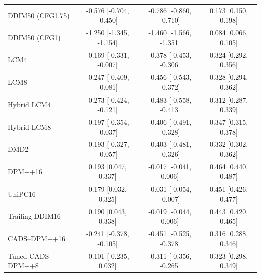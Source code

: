 \begin{table}[t]
\begin{tabular}{lccc}
DDIM50 (CFG1.75) & -0.576 [-0.704, -0.450] & -0.786 [-0.860, -0.710] & 0.173 [0.150, 0.198] \\
DDIM50 (CFG1) & -1.250 [-1.345, -1.154] & -1.460 [-1.566, -1.351] & 0.084 [0.066, 0.105] \\
LCM4 & -0.169 [-0.331, -0.007] & -0.378 [-0.453, -0.306] & 0.324 [0.292, 0.356] \\
LCM8 & -0.247 [-0.409, -0.081] & -0.456 [-0.543, -0.372] & 0.328 [0.294, 0.362] \\
Hybrid LCM4 & -0.273 [-0.424, -0.121] & -0.483 [-0.558, -0.413] & 0.312 [0.287, 0.339] \\
Hybrid LCM8 & -0.197 [-0.354, -0.037] & -0.406 [-0.491, -0.328] & 0.347 [0.315, 0.378] \\
DMD2 & -0.193 [-0.327, -0.057] & -0.403 [-0.481, -0.326] & 0.332 [0.302, 0.362] \\
DPM++16 & 0.193 [0.047, 0.337] & -0.017 [-0.041, 0.006] & 0.464 [0.440, 0.487] \\
UniPC16 & 0.179 [0.032, 0.325] & -0.031 [-0.054, -0.007] & 0.451 [0.426, 0.477] \\
Trailing DDIM16 & 0.190 [0.043, 0.338] & -0.019 [-0.044, 0.006] & 0.443 [0.420, 0.465] \\
CADS--DPM++16 & -0.241 [-0.378, -0.105] & -0.451 [-0.525, -0.378] & 0.316 [0.288, 0.346] \\
Tuned CADS--DPM++8 & -0.101 [-0.235, 0.032] & -0.311 [-0.356, -0.265] & 0.323 [0.298, 0.349] \\
\bottomrule\end{tabular}\end{table}
